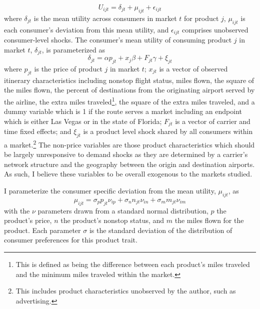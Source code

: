 \documentclass{article}
\begin{document}
	\[U_{ijt} = \delta_{jt} + \mu_{ijt} + \epsilon_{ijt}\] where $\delta_{jt}$ is the mean utility across consumers in market $t$ for product $j$, $\mu_{ijt}$ is each consumer's deviation from this mean utility, and $\epsilon_{ijt}$ comprises unobserved consumer-level shocks. The consumer's mean utility of consuming product $j$ in market $t$,  $\delta_{jt}$, is parameterized as \[\delta_{jt} = \alpha p_{jt} + x_{j} \beta + F_{jt}\gamma  +  \xi_{jt}\] where $p_{jt}$ is the price of product $j$ in market $t$; $x_{jt}$ is a vector of observed itinerary characteristics including nonstop flight status, miles flown, the square of the miles flown, the percent of destinations from the originating airport served by the airline, the extra miles traveled\footnote{This is defined as being the difference between each product's miles traveled and the minimum miles traveled within the market.}, the square of the extra miles traveled, and a dummy variable which is 1 if the route serves a market including an endpoint which is either Las Vegas or in the state of Florida; $F_{jt}$ is a vector of carrier and time fixed effects; and $\xi_{jt}$ is a product level shock shared by all consumers within a market.\footnote{This includes product characteristics unobserved by the author, such as advertising.} The non-price variables are those product characteristics which should be largely unresponsive to demand shocks as they are determined by a carrier's network structure and the geography between the origin and destination airports. As such, I believe these variables to be overall exogenous to the markets studied.
	 
    I parameterize the consumer specific deviation from the mean utility, $\mu_{ijt}$, as \[\mu_{ijt} = \sigma_{p} p_{jt} \nu_{ip} + \sigma_{n} n_{jt} \nu_{in} + \sigma_{m} m_{jt} \nu_{im} \] with the $\nu$ parameters drawn from a standard normal distribution, $p$ the product's price, $n$ the product's nonstop status, and $m$ the miles flown for the product. Each parameter $\sigma$ is the standard deviation of the distribution of consumer preferences for this product trait.  
    
\end{document}
